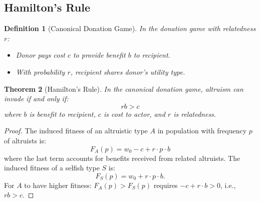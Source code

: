 \documentclass[12pt]{article}
\newtheorem{theorem}{Theorem}[section]
\newtheorem{definition}[theorem]{Definition}
\begin{document}
\subsection{Hamilton's Rule}

\begin{definition}[Canonical Donation Game]
In the donation game with relatedness $r$:
\begin{itemize}
    \item Donor pays cost $c$ to provide benefit $b$ to recipient.
    \item With probability $r$, recipient shares donor's utility type.
\end{itemize}
\end{definition}

\begin{theorem}[Hamilton's Rule]
\label{thm:hamilton}
In the canonical donation game, altruism can invade if and only if:
\[
rb > c
\]
where $b$ is benefit to recipient, $c$ is cost to actor, and $r$ is relatedness.
\end{theorem}

\begin{proof}
The induced fitness of an altruistic type $A$ in population with frequency $p$ of altruists is:
\[
F_A(p) = w_0 - c + r \cdot p \cdot b
\]
where the last term accounts for benefits received from related altruists. The induced fitness of a selfish type $S$ is:
\[
F_S(p) = w_0 + r \cdot p \cdot b.
\]
For $A$ to have higher fitness: $F_A(p) > F_S(p)$ requires $-c + r \cdot b > 0$, i.e., $rb > c$.
\end{proof}
\end{document}
